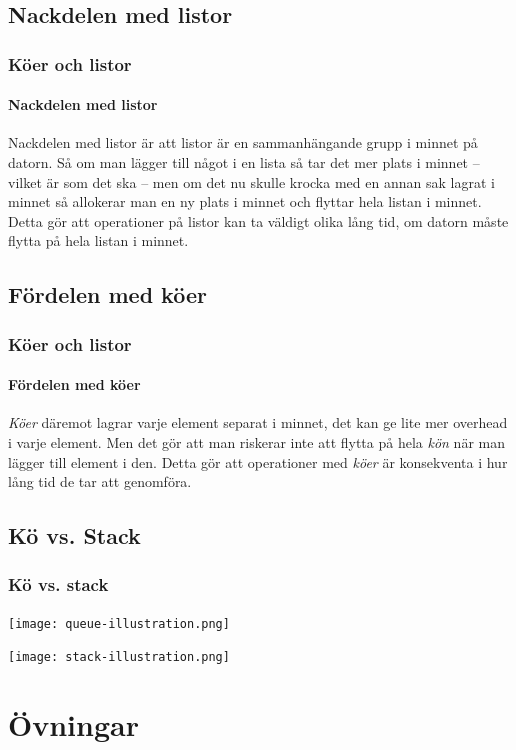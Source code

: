 \documentclass[aspectratio=169]{beamer}
\begin{document}
\subsection{Nackdelen med listor}
	
\begin{frame}
	\frametitle{Köer och listor}
	\framesubtitle{Nackdelen med listor}
	
	Nackdelen med listor är att listor är en sammanhängande grupp i minnet på datorn. Så om man lägger till något i en lista så tar det mer plats i minnet -- vilket är som det ska -- men om det nu skulle krocka med en annan sak lagrat i minnet så allokerar man en ny plats i minnet och flyttar hela listan i minnet. Detta gör att operationer på listor kan ta väldigt olika lång tid, om datorn måste flytta på hela listan i minnet.

\end{frame}

\subsection{Fördelen med köer}

\begin{frame}
	\frametitle{Köer och listor}
	\framesubtitle{Fördelen med köer}
	
	\textit{Köer} däremot lagrar varje element separat i minnet, det kan ge lite mer overhead i varje element. Men det gör att man riskerar inte att flytta på hela \textit{kön} när man lägger till element i den. Detta gör att operationer med \textit{köer} är konsekventa i hur lång tid de tar att genomföra.
	
\end{frame}

\subsection{Kö vs. Stack}

\begin{frame}
	\frametitle{Kö vs. stack}

	\centering
	
	\texttt{[image: queue-illustration.png]}
	
	\texttt{[image: stack-illustration.png]}
	
\end{frame}

\section{Övningar}
\end{document}
